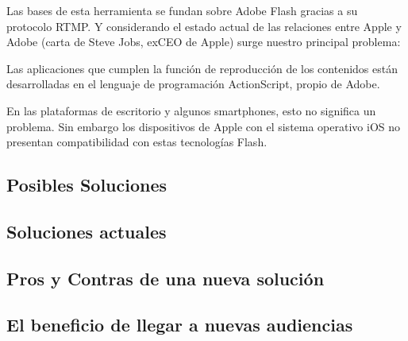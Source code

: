 Las bases de esta herramienta se fundan sobre Adobe Flash gracias a su protocolo RTMP. Y considerando el estado actual de las relaciones entre Apple y Adobe (carta de Steve Jobs, exCEO de Apple) surge nuestro principal problema:

	Las aplicaciones que cumplen la función de reproducción de los contenidos están desarrolladas en el lenguaje de programación ActionScript, propio de Adobe.

En las plataformas de escritorio y algunos smartphones, esto no significa un problema. Sin embargo los dispositivos de Apple con el sistema operativo iOS no presentan compatibilidad con estas tecnologías Flash.

\subsection{Posibles Soluciones}
\subsection{Soluciones actuales}
\subsection{Pros y Contras de una nueva solución}
\subsection{El beneficio de llegar a nuevas audiencias}




